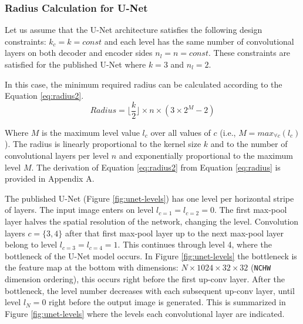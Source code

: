 \documentclass[letterpaper]{article} %
\begin{document}
\subsubsection{Radius Calculation for U-Net}

Let us assume that the U-Net architecture satisfies the following design constraints:
$k_c = k = const$ and each level has the same number of convolutional layers on both decoder and encoder sides $n_l = n = const$. These constraints are satisfied for the published U-Net where $k = 3$ and $n_l = 2$.

In this case, the minimum required radius can be calculated according to the Equation \ref{eq:radius2}. 
\begin{equation}
Radius = \lfloor \frac{k}{2} \rfloor \times n \times (3 \times 2^{M} - 2)
\label{eq:radius2}
\end{equation}

Where $M$ is the maximum level value $l_c$ over all values of $c$ (i.e., $M=max_{\forall c} (l_c)$). The radius is linearly proportional to the kernel size $k$ and to the number of convolutional layers per level $n$ and exponentially proportional to the maximum level $M$. The derivation of Equation \ref{eq:radius2} from Equation \ref{eq:radius} is provided in Appendix A.

The published U-Net (Figure \ref{fig:unet-levels}) has one level per horizontal stripe of layers. The input image enters on level $l_{c=1} = l_{c=2} = 0$. The first max-pool layer halves the spatial resolution of the network, changing the level. Convolution layers $c = \{3, 4\}$ after that first max-pool layer up to the next max-pool layer belong to level $l_{c=3}=l_{c=4} = 1$. This continues through level 4, where the bottleneck of the U-Net model occurs. In Figure \ref{fig:unet-levels} the bottleneck is the feature map at the bottom with dimensions: $N \times 1024 \times 32 \times 32$ (\texttt{NCHW} dimension ordering), this occurs right before the first up-conv layer. After the bottleneck, the level number decreases with each subsequent up-conv layer, until level $l_{N} = 0$ right before the output image is generated. This is summarized in Figure \ref{fig:unet-levels} where the levels each convolutional layer are indicated.
\end{document}
